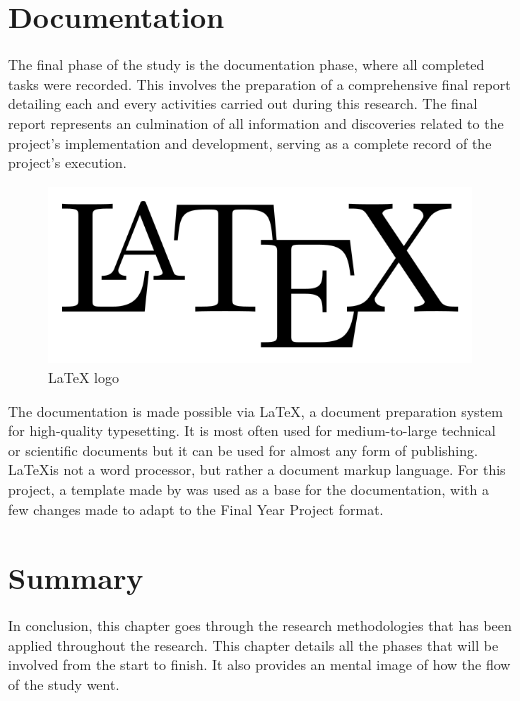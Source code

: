 \newpage
\section{Documentation}
The final phase of the study is the documentation phase, where all completed tasks were recorded. This involves the preparation of a comprehensive final report detailing each and every activities carried out during this research. The final report represents an culmination of all information and discoveries related to the project's implementation and development, serving as a complete record of the project's execution.

\begin{figure}[h]
    \centering
    \includegraphics[scale=0.3]{mainmatter/images/research methodology/LaTeX_logo.png}
    \caption{LaTeX logo}
    \label{fig:latex}
\end{figure}

The documentation is made possible via \LaTeX, a document preparation system for high-quality typesetting. It is most often used for medium-to-large technical or scientific documents but it can be used for almost any form of publishing. \LaTeX is not a word processor, but rather a document markup language. For this project, a template made by \textcite{Rizauddin2023} was used as a base for the documentation, with a few changes made to adapt to the Final Year Project format. 

\newpage
\section{Summary}
In conclusion, this chapter goes through the research methodologies that has been applied throughout the research. This chapter details all the phases that will be involved from the start to finish. It also provides an mental image of how the flow of the study went.


